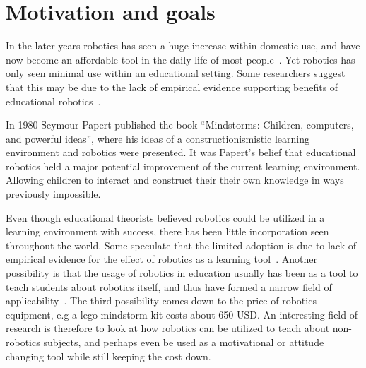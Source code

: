 \section{Motivation and goals}
	In the later years robotics has seen a huge increase within domestic use, and have now become an affordable tool in the daily life of most people~\cite{kara2003sizing,hsiu2003designing}.
	Yet robotics has only seen minimal use within an educational setting. Some researchers suggest that this may be due to the lack of empirical evidence
	supporting benefits of educational robotics~\cite{williams2007acquisition}. 
	
\bigskip\noindent
In 1980 Seymour Papert published the book ``Mindstorms: Children, computers, and powerful ideas''\cite{papert1980mindstorms}, where his ideas of a constructionismistic 
learning environment and robotics were presented. It was Papert's belief that educational robotics held a major potential improvement of the current learning environment.
Allowing children to interact and construct their their own knowledge in ways previously impossible. 

\bigskip\noindent
Even though educational theorists believed robotics could be utilized in a learning environment with success, there has been little
incorporation seen throughout the world. 
Some speculate that the limited adoption is due to lack of empirical evidence for the effect of robotics as a learning tool~\cite{williams2007acquisition}.  
Another possibility is that the usage of robotics in education usually has been as a tool to teach students about robotics itself, 
and thus have formed a narrow field of applicability~\cite{rusk2008new}. 
The third possibility comes down to the price of robotics equipment, e.g a lego mindstorm kit costs about 650 USD. 
An interesting field of research is therefore to look at how robotics can be utilized to teach about non-robotics subjects, and perhaps even be used as a motivational or attitude changing tool while still keeping the cost down. 

	
